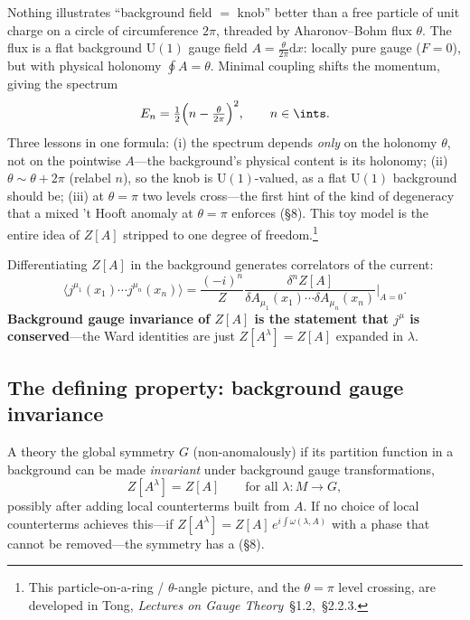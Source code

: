 \documentclass[11pt]{article}
\newcommand{\dd}{\mathrm{d}}                 %
\newcommand{\Uone}{\mathrm{U}(1)}
\begin{document}
\begin{eexample}
Nothing illustrates ``background field $=$ knob'' better than a free particle of unit
charge on a circle of circumference $2\pi$, threaded by Aharonov--Bohm flux $\theta$.
The flux is a flat background $\Uone$ gauge field $A=\frac{\theta}{2\pi}\dd x$: locally
pure gauge ($F=0$), but with physical holonomy $\oint A=\theta$. Minimal coupling shifts
the momentum, giving the spectrum
\[
E_n = \tfrac12\Big(n-\tfrac{\theta}{2\pi}\Big)^2,\qquad n\in\ints .
\]
Three lessons in one formula: (i) the spectrum depends \emph{only} on the holonomy
$\theta$, not on the pointwise $A$---the background's physical content is its holonomy;
(ii) $\theta\sim\theta+2\pi$ (relabel $n$), so the knob is $\Uone$-valued, as a flat
$\Uone$ background should be; (iii) at $\theta=\pi$ two levels cross---the first hint of
the kind of degeneracy that a mixed 't Hooft anomaly at $\theta=\pi$ enforces (\S8). This
toy model is the entire idea of $Z[A]$ stripped to one degree of freedom.\footnote{This
particle-on-a-ring / $\theta$-angle picture, and the $\theta=\pi$ level crossing, are
developed in Tong, \emph{Lectures on Gauge Theory}~\S1.2,~\S2.2.3.}
\end{eexample}

\begin{eequation}
Differentiating $Z[A]$ in the background generates correlators of the current:
\[
\langle j^{\mu_1}(x_1)\cdots j^{\mu_n}(x_n)\rangle
= \frac{(-i)^n}{Z}\frac{\delta^n Z[A]}{\delta A_{\mu_1}(x_1)\cdots \delta A_{\mu_n}(x_n)}\bigg|_{A=0}.
\]
\textbf{Background gauge invariance of $Z[A]$ is the statement that $j^\mu$ is
conserved}---the Ward identities are just $Z[A^\lambda]=Z[A]$ expanded in $\lambda$.
\end{eequation}

\subsection{The defining property: background gauge invariance}

\begin{ddefinition}
A theory  the global symmetry $G$ (non-anomalously) if its partition
function in a background can be made \emph{invariant} under background gauge
transformations,
\[
Z[A^\lambda] = Z[A]\qquad\text{for all }\lambda:M\to G,
\]
possibly after adding local counterterms built from $A$. If no choice of local
counterterms achieves this---if $Z[A^\lambda]=Z[A]\,e^{i\int \omega(\lambda,A)}$ with a
phase that cannot be removed---the symmetry has a  (\S8).
\end{ddefinition}
\end{document}
